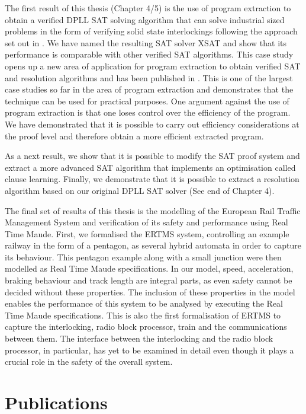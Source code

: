 The first result of this thesis (Chapter 4/5) is the use of program extraction to obtain a verified DPLL SAT solving algorithm that can solve industrial sized problems in the form of verifying solid state interlockings following the approach set out in \cite{AL14a}. We have named the resulting SAT solver XSAT and show that its performance is comparable with other verified SAT algorithms. This case study opens up a new area of application for program extraction to obtain verified SAT and resolution algorithms and has been published in \cite{AL12,AL14b}. This is one of the largest case studies so far in the area of program extraction and demonstrates that the technique can be used for practical purposes.  One argument against the use of program extraction is that one loses control over the efficiency of the program. We have demonstrated that it is possible to carry out efficiency considerations at the proof level and therefore obtain a more efficient extracted program. 

As a next result, we show that it is possible to modify the SAT proof system and extract a more advanced SAT algorithm that implements an optimisation called clause learning. Finally, we demonstrate that it is possible to extract a resolution algorithm based on our original DPLL SAT solver (See end of Chapter 4).


The final set of  results of this thesis is the modelling of the European Rail Traffic Management System and verification of its safety and performance using Real Time Maude. First, we formalised the ERTMS system, controlling an example railway in the form of a pentagon, as several hybrid automata in order to capture its behaviour.  This pentagon example along with a small junction were then modelled as Real Time Maude specifications. In our model, speed, acceleration, braking behaviour and track length are integral parts, as even safety cannot be decided without these properties. The inclusion of these properties in the model enables the performance of this system to be analysed by executing the Real Time Maude specifications. This is also the first formalisation of ERTMS to capture the interlocking, radio block processor, train and the communications between them. The interface between the interlocking and the radio block processor, in particular, has yet to be examined in detail even though it plays a crucial role in the safety of the overall system.

\section{Publications}

